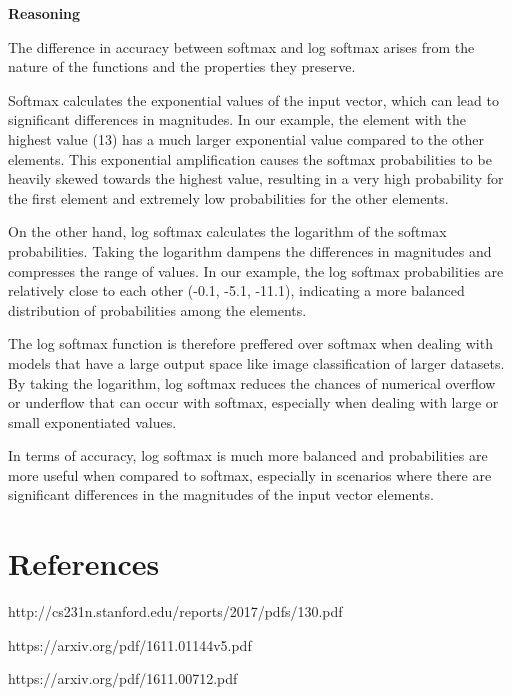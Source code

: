 \documentclass{article}
\begin{document}
\textbf{Reasoning}

The difference in accuracy between softmax and log softmax arises from the nature of the functions and the properties they preserve.

Softmax calculates the exponential values of the input vector, which can lead to significant differences in magnitudes. In our example, the element with the highest value (13) has a much larger exponential value compared to the other elements. This exponential amplification causes the softmax probabilities to be heavily skewed towards the highest value, resulting in a very high probability for the first element and extremely low probabilities for the other elements.

On the other hand, log softmax calculates the logarithm of the softmax probabilities. Taking the logarithm dampens the differences in magnitudes and compresses the range of values. In our example, the log softmax probabilities are relatively close to each other (-0.1, -5.1, -11.1), indicating a more balanced distribution of probabilities among the elements.

The log softmax function is therefore preffered over softmax when dealing with models that have a large output space like image classification of larger datasets. By taking the logarithm, log softmax reduces the chances of numerical overflow or underflow that can occur with softmax, especially when dealing with large or small exponentiated values.

In terms of accuracy, log softmax is much more balanced and probabilities are more useful when compared to softmax, especially in scenarios where there are significant differences in the magnitudes of the input vector elements.

\section{References}

http://cs231n.stanford.edu/reports/2017/pdfs/130.pdf

https://arxiv.org/pdf/1611.01144v5.pdf

https://arxiv.org/pdf/1611.00712.pdf
\end{document}
